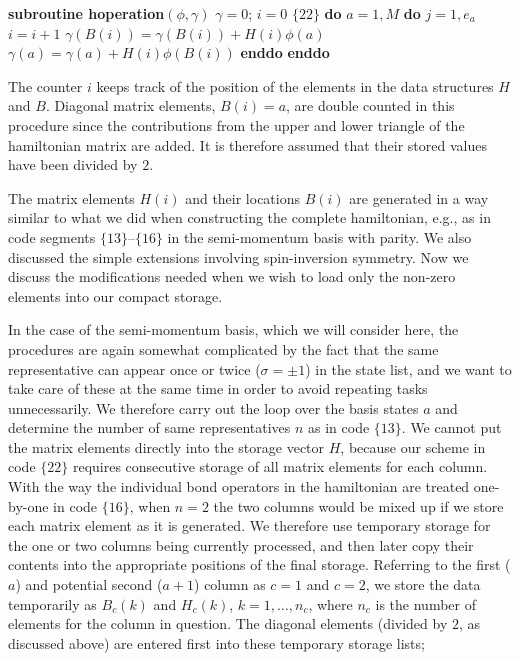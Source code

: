 \documentclass[draft,numberedheadings]{aipproc}
\newcommand{\code}{\null\vskip-2mm\noindent}
\newcommand{\br}{\hfill\break}
\newcommand{\cia}{\null\hskip5mm}
\newcommand{\cib}{\null\hskip10mm}
\newcommand{\cic}{\null\hskip15mm}
\begin{document}
{\code
\cia    {\bf subroutine hoperation}$(\phi,\gamma)$  \br
\cia    $\gamma=0$; $i=0$                \hfill $\{22\}$\break 
\cia    {\bf do} $a=1,M$  \br         
\cib       {\bf do} $j=1,e_a$ \br
\cic          $i=i+1$ \br             
\cic          $\gamma(B(i))=\gamma(B(i))+H(i)\phi(a)$ \br 
\cic          $\gamma(a)=\gamma(a)+H(i)\phi(B(i))$ \br 
\cib       {\bf enddo}  \br
\cia    {\bf enddo} 
\code}

\noindent
The counter $i$ keeps track of the position of the elements in the data structures $H$ and $B$. Diagonal matrix elements, $B(i)=a$, are double counted 
in this procedure since the contributions from the upper and lower triangle of the hamiltonian matrix are added. It is therefore assumed that their
stored values have been divided by $2$.

The matrix elements $H(i)$ and their locations $B(i)$ are generated in a way similar to what we did when constructing the complete hamiltonian, e.g., 
as in code segments $\{13\}$--$\{16\}$ in the semi-momentum basis with parity. We also discussed the simple extensions involving spin-inversion symmetry. 
Now we discuss the modifications needed when we wish to load only the non-zero elements into our compact storage. 

In the case of the semi-momentum basis, which we will consider here, the procedures are again somewhat complicated by the fact that the same 
representative can appear once or twice ($\sigma = \pm 1$) in the state list, and we want to take care of these at the same time in order to avoid 
repeating tasks unnecessarily. We therefore carry out the loop over the basis states $a$ and determine the number of same representatives $n$ as in 
code $\{13\}$. We cannot put the matrix elements directly into the storage vector $H$, because our scheme in code $\{22\}$ requires consecutive 
storage of all matrix elements for each column. With the way the individual bond operators in the hamiltonian are treated one-by-one in code 
$\{16\}$, when $n=2$ the two columns would be mixed up if we store each matrix element as it is generated. We therefore use temporary storage 
for the one or two columns being currently processed, and then later copy their contents into the appropriate positions of the final storage. 
Referring to the first ($a$) and potential second ($a+1$) column as $c=1$ and $c=2$, we store the data temporarily as $B_{c}(k)$ and 
$H_{c}(k)$, $k=1,\ldots,n_c$, where $n_c$ is the number of elements for the column in question. The diagonal elements (divided by $2$, as discussed 
above) are entered first into these temporary storage lists;
\end{document}
